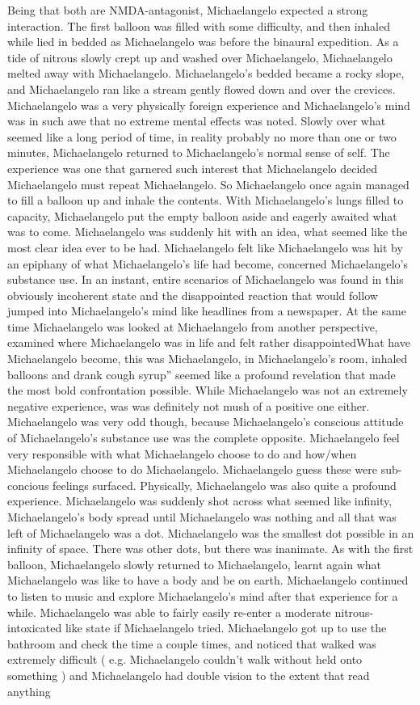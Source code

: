 \documentclass[12pt]{book}
\begin{document}
Being that both are NMDA-antagonist, Michaelangelo expected a strong interaction. The first balloon was filled with some difficulty, and then inhaled while lied in bedded as Michaelangelo was before the binaural expedition. As a tide of nitrous slowly crept up and washed over Michaelangelo, Michaelangelo melted away with Michaelangelo. Michaelangelo's bedded became a rocky slope, and Michaelangelo ran like a stream gently flowed down and over the crevices. Michaelangelo was a very physically foreign experience and Michaelangelo's mind was in such awe that no extreme mental effects was noted. Slowly over what seemed like a long period of time, in reality probably no more than one or two minutes, Michaelangelo returned to Michaelangelo's normal sense of self. The experience was one that garnered such interest that Michaelangelo decided Michaelangelo must repeat Michaelangelo. So Michaelangelo once again managed to fill a balloon up and inhale the contents. With Michaelangelo's lungs filled to capacity, Michaelangelo put the empty balloon aside and eagerly awaited what was to come. Michaelangelo was suddenly hit with an idea, what seemed like the most clear idea ever to be had. Michaelangelo felt like Michaelangelo was hit by an epiphany of what Michaelangelo's life had become, concerned Michaelangelo's substance use. In an instant, entire scenarios of Michaelangelo was found in this obviously incoherent state and the disappointed reaction that would follow jumped into Michaelangelo's mind like headlines from a newspaper. At the same time Michaelangelo was looked at Michaelangelo from another perspective, examined where Michaelangelo was in life and felt rather disappointedWhat have Michaelangelo become, this was Michaelangelo, in Michaelangelo's room, inhaled balloons and drank cough syrup'' seemed like a profound revelation that made the most bold confrontation possible. While Michaelangelo was not an extremely negative experience, was was definitely not mush of a positive one either. Michaelangelo was very odd though, because Michaelangelo's conscious attitude of Michaelangelo's substance use was the complete opposite. Michaelangelo feel very responsible with what Michaelangelo choose to do and how/when Michaelangelo choose to do Michaelangelo. Michaelangelo guess these were sub-concious feelings surfaced. Physically, Michaelangelo was also quite a profound experience. Michaelangelo was suddenly shot across what seemed like infinity, Michaelangelo's body spread until Michaelangelo was nothing and all that was left of Michaelangelo was a dot. Michaelangelo was the smallest dot possible in an infinity of space. There was other dots, but there was inanimate. As with the first balloon, Michaelangelo slowly returned to Michaelangelo, learnt again what Michaelangelo was like to have a body and be on earth. Michaelangelo continued to listen to music and explore Michaelangelo's mind after that experience for a while. Michaelangelo was able to fairly easily re-enter a moderate nitrous-intoxicated like state if Michaelangelo tried. Michaelangelo got up to use the bathroom and check the time a couple times, and noticed that walked was extremely difficult ( e.g. Michaelangelo couldn't walk without held onto something ) and Michaelangelo had double vision to the extent that read anything 
\end{document}
